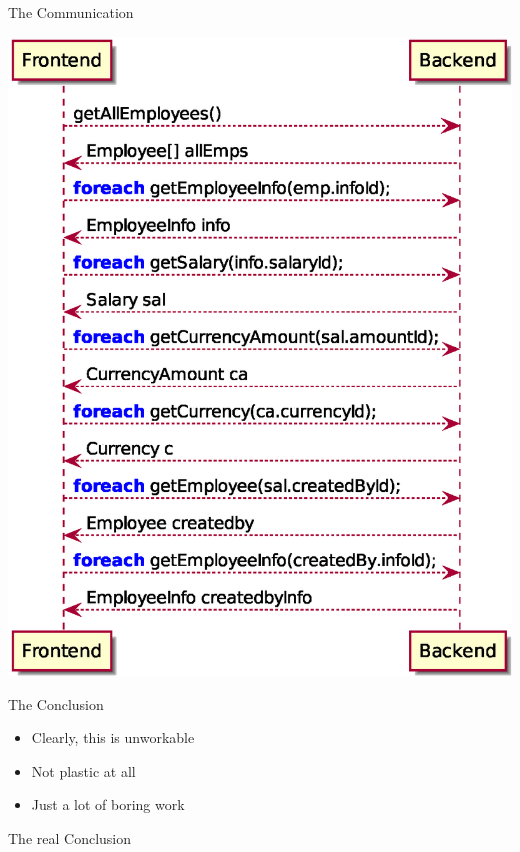 \documentclass[aspectratio=169,notes]{beamer}
\begin{document}
	\begin{frame}[fragile]{The Communication}
		\begin{center}
			\includegraphics[height=0.9\textheight]{restbackend.eps}
		\end{center}
	\end{frame}
	
	\begin{frame}[fragile]{The Conclusion}
		\begin{itemize}
			\item Clearly, this is unworkable
			\item Not plastic at all
			\item Just a lot of boring work
		\end{itemize}
	\end{frame}

	\begin{frame}{The real Conclusion}
		\begin{center}
		\end{center}
	\end{frame}
\end{document}
